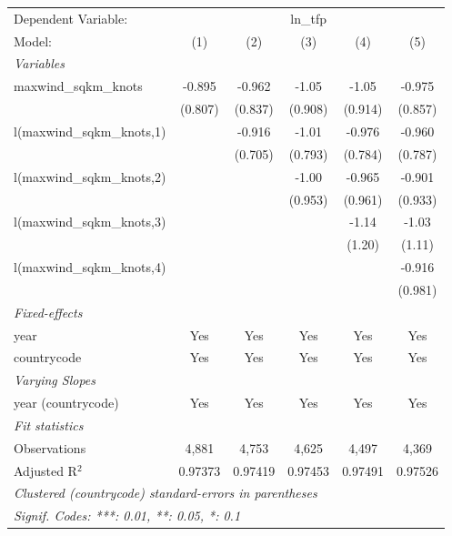 
\begingroup
\centering
\begin{tabular}{lccccc}
   \tabularnewline \midrule \midrule
   Dependent Variable: & \multicolumn{5}{c}{ln\_tfp}\\
   Model:                      & (1)     & (2)     & (3)     & (4)     & (5)\\  
   \midrule
   \emph{Variables}\\
   maxwind\_sqkm\_knots        & -0.895  & -0.962  & -1.05   & -1.05   & -0.975\\   
                               & (0.807) & (0.837) & (0.908) & (0.914) & (0.857)\\   
   l(maxwind\_sqkm\_knots,1)   &         & -0.916  & -1.01   & -0.976  & -0.960\\   
                               &         & (0.705) & (0.793) & (0.784) & (0.787)\\   
   l(maxwind\_sqkm\_knots,2)   &         &         & -1.00   & -0.965  & -0.901\\   
                               &         &         & (0.953) & (0.961) & (0.933)\\   
   l(maxwind\_sqkm\_knots,3)   &         &         &         & -1.14   & -1.03\\   
                               &         &         &         & (1.20)  & (1.11)\\   
   l(maxwind\_sqkm\_knots,4)   &         &         &         &         & -0.916\\   
                               &         &         &         &         & (0.981)\\   
   \midrule
   \emph{Fixed-effects}\\
   year                        & Yes     & Yes     & Yes     & Yes     & Yes\\  
   countrycode                 & Yes     & Yes     & Yes     & Yes     & Yes\\  
   \midrule
   \emph{Varying Slopes}\\
   year (countrycode)          & Yes     & Yes     & Yes     & Yes     & Yes\\  
   \midrule
   \emph{Fit statistics}\\
   Observations                & 4,881   & 4,753   & 4,625   & 4,497   & 4,369\\  
   Adjusted R$^2$              & 0.97373 & 0.97419 & 0.97453 & 0.97491 & 0.97526\\  
   \midrule \midrule
   \multicolumn{6}{l}{\emph{Clustered (countrycode) standard-errors in parentheses}}\\
   \multicolumn{6}{l}{\emph{Signif. Codes: ***: 0.01, **: 0.05, *: 0.1}}\\
\end{tabular}
\par\endgroup


